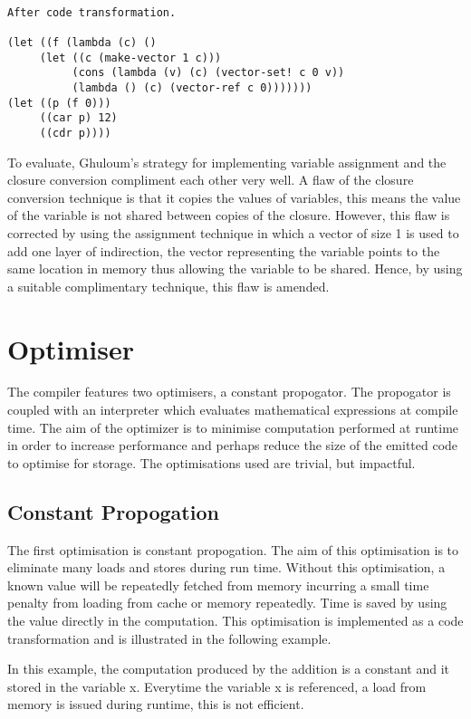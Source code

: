 \documentclass{article}
\begin{document}
\begin{verbatim}

After code transformation. 

(let ((f (lambda (c) ()
     (let ((c (make-vector 1 c)))
     	  (cons (lambda (v) (c) (vector-set! c 0 v))
	  	  (lambda () (c) (vector-ref c 0)))))))
(let ((p (f 0)))
     ((car p) 12)
     ((cdr p))))
\end{verbatim}

To evaluate, Ghuloum's strategy for implementing variable assignment and the closure conversion compliment each other very well. A flaw of the closure conversion technique is that it copies the values of variables, this means the value of the variable is not shared between copies of the closure. However, this flaw is corrected by using the assignment technique in which a vector of size 1 is used to add one layer of indirection, the vector representing the variable points to the same location in memory thus allowing the variable to be shared. Hence, by using a suitable complimentary technique, this flaw is amended.

\section{Optimiser}

The compiler features two optimisers, a constant propogator. The propogator is coupled with an interpreter which evaluates mathematical expressions at compile time. The aim of the optimizer is to minimise computation performed at runtime in order to increase performance and perhaps reduce the size of the emitted code to optimise for storage. The optimisations used are trivial, but impactful.

\subsection{Constant Propogation}

The first optimisation is constant propogation. The aim of this optimisation is to eliminate many loads and stores during run time. Without this optimisation, a known value will be repeatedly fetched from memory incurring a small time penalty from loading from cache or memory repeatedly. Time is saved by using the value directly in the computation. This optimisation is implemented as a code transformation and is illustrated in the following example.

In this example, the computation produced by the addition is a constant and it stored in the variable x. Everytime the variable x is referenced, a load from memory is issued during runtime, this is not efficient.
\end{document}
